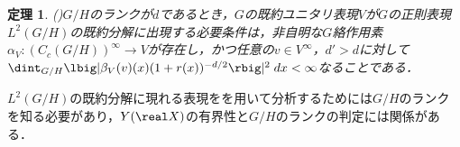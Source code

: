 \documentclass[12pt,dvipdfmx,uplatex]{jsarticle}
\newcounter{countabst}
\newtheorem{thm-a}[countabst]{定理}
\newtheorem{def-a}[countabst]{定義}
\begin{document}
\begin{thm-a}(\cite[pp.~665--6]{ber88})\label{thm:plancherel}
  $G/H$のランクが$d$であるとき，$G$の既約ユニタリ表現$V$が$G$の正則表現$L^2(G/H)$の既約分解に出現する必要条件は，非自明な$G$絡作用素$\alpha_V\colon (C_c(G/H))^{\infty}\to V $が存在し，かつ任意の$v\in V^{\infty} $，$d' > d$に対して$\dint_{G/H}\lbig|\beta_V(v)(x)(1+r(x))^{-d/2} \rbig|^2\; dx < \infty $なることである．%
\end{thm-a}

$L^2(G/H)$の既約分解に現れる表現をを用いて分析するためには$G/H$のランクを知る必要があり，$Y(\real X) $の有界性と$G/H$のランクの判定には関係がある．%






\end{document}
